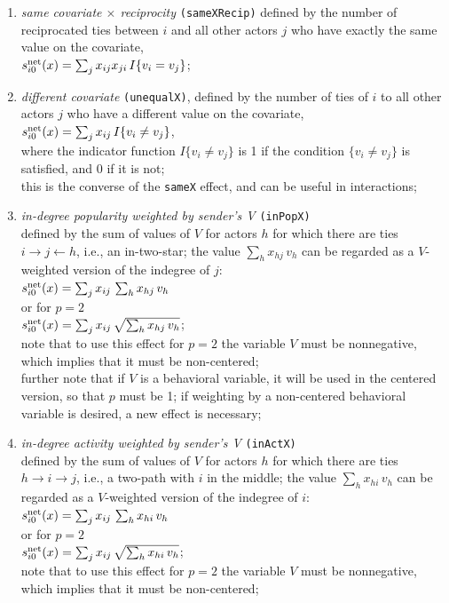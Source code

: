 \documentclass[a4paper,fleqn,11pt]{article}
\newcommand{\+}{\, + \,}
\newcommand{\vit}{\theenumi}
\begin{document}
\begin{enumerate}
 \item {\em same covariate $\times$ reciprocity}
\texttt{(sameXRecip)} defined by the
 number of reciprocated ties between $i$ and all other actors $j$ who have
 exactly the same value on the covariate,\\
 $s^{\rm net}_{i\vit}(x) = \sum_j x_{ij} x_{ji}\, I\{v_i = v_j \} $;

 \item \emph{different covariate}  \texttt{(unequalX)},  defined by the
 number of ties of $i$ to all other actors $j$ who have
 a different value on the covariate,\\
 $s^{\rm net}_{i\vit}(x) = \sum_j x_{ij}\, I\{v_i \neq v_j \} $,\\
 where the indicator function $I\{v_i \neq v_j \} $ is 1 if the condition $\{v_i \neq v_j \} $
 is satisfied, and 0 if it is not;\\
 this is the converse of the  \texttt{sameX} effect,
 and can be useful in interactions;

 \item {\em in-degree popularity weighted by sender's V }
  \texttt{(inPopX)}\\
 defined by the sum of values of $V$ for actors $h$
 for which there are ties  $ i \rightarrow j \leftarrow h$,
 i.e., an in-two-star;
 the value $\sum_h x_{hj}\,v_h$ can be regarded as a $V$-weighted
 version of the indegree of $j$:\\
 $s^{\rm net}_{i\vit}(x) =  \sum_j x_{ij}\, \sum_h x_{hj}\,v_h  $ \\
 or for $p=2$ \\
   $s^{\rm net}_{i\vit}(x) =  \sum_j x_{ij}\, \sqrt{\sum_h x_{hj}\,v_h}   $;\\
 note that to use this effect for $p=2$ the variable $V$ must be nonnegative,
 which implies that it must be non-centered;\\
 further note that if $V$ is a behavioral variable, it will be used
 in the centered version, so that $p$ must be 1; if weighting by
 a non-centered behavioral variable is desired, a new effect is necessary;

 \item {\em in-degree activity weighted by sender's V } \texttt{(inActX)}\\
 defined by the sum of values of $V$ for actors $h$
 for which there are ties  $h \rightarrow i \rightarrow j$,
 i.e., a two-path with $i$ in the middle;
 the value $\sum_h x_{hi}\,v_h$ can be regarded as a $V$-weighted
 version of the indegree of $i$:\\
 $s^{\rm net}_{i\vit}(x) =  \sum_j x_{ij}\, \sum_h x_{hi}\,v_h  $ \\
 or for $p=2$ \\
   $s^{\rm net}_{i\vit}(x) =  \sum_j x_{ij}\, \sqrt{\sum_h x_{hi}\,v_h}   $;\\
 note that to use this effect for $p=2$ the variable $V$ must be nonnegative,
 which implies that it must be non-centered;



\end{enumerate}
\end{document}
